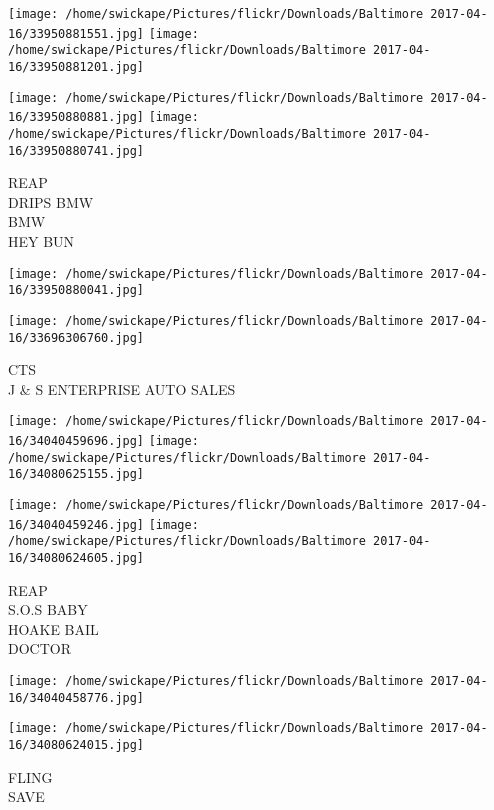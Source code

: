 \documentclass[10pt,letterpaper]{article}
\begin{document}
\texttt{[image: /home/swickape/Pictures/flickr/Downloads/Baltimore 2017-04-16/33950881551.jpg]}
\texttt{[image: /home/swickape/Pictures/flickr/Downloads/Baltimore 2017-04-16/33950881201.jpg]}

\texttt{[image: /home/swickape/Pictures/flickr/Downloads/Baltimore 2017-04-16/33950880881.jpg]}
\texttt{[image: /home/swickape/Pictures/flickr/Downloads/Baltimore 2017-04-16/33950880741.jpg]}

REAP\\
DRIPS BMW\\
BMW\\
HEY BUN\\
\pagebreak

\texttt{[image: /home/swickape/Pictures/flickr/Downloads/Baltimore 2017-04-16/33950880041.jpg]}

\vspace{0.25in}
\texttt{[image: /home/swickape/Pictures/flickr/Downloads/Baltimore 2017-04-16/33696306760.jpg]}

CTS\\
J \& S ENTERPRISE AUTO SALES\\
\pagebreak

\texttt{[image: /home/swickape/Pictures/flickr/Downloads/Baltimore 2017-04-16/34040459696.jpg]}
\texttt{[image: /home/swickape/Pictures/flickr/Downloads/Baltimore 2017-04-16/34080625155.jpg]}

\texttt{[image: /home/swickape/Pictures/flickr/Downloads/Baltimore 2017-04-16/34040459246.jpg]}
\texttt{[image: /home/swickape/Pictures/flickr/Downloads/Baltimore 2017-04-16/34080624605.jpg]}

REAP\\
S.O.S BABY\\
HOAKE BAIL\\
DOCTOR\\
\pagebreak

\texttt{[image: /home/swickape/Pictures/flickr/Downloads/Baltimore 2017-04-16/34040458776.jpg]}

\vspace{0.25in}
\texttt{[image: /home/swickape/Pictures/flickr/Downloads/Baltimore 2017-04-16/34080624015.jpg]}

FLING\\
SAVE\\
\pagebreak
\end{document}
